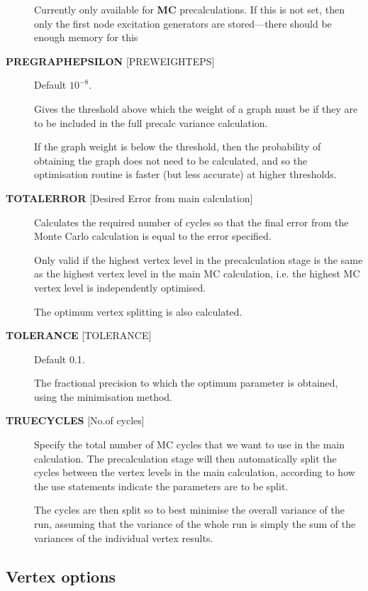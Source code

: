\documentclass[openany,a4paper,10pt]{manual}
\begin{document}
\begin{description}
Currently only available for \textbf{MC} precalculations. If this is not
set, then only the first node excitation generators are stored---there
should be enough memory for this

\item[\textbf{PREGRAPHEPSILON} {[}PREWEIGHTEPS{]}]
Default $10^{-8}$.

Gives the threshold above which the weight of a graph must be if
they are to be included in the full precalc variance calculation.

If the graph weight is below the threshold, then the probability
of obtaining the graph does not need to be calculated, and so
the optimisation routine is faster (but less accurate) at higher
thresholds.

\item[\textbf{TOTALERROR} {[}Desired Error from main calculation{]}]
Calculates the required number of cycles so that the final
error from the Monte Carlo calculation is equal to the error specified.

Only valid if the highest vertex level in the precalculation stage is the
same as the highest vertex level in the main MC calculation, i.e. the
highest MC vertex level is independently optimised.

The optimum vertex splitting is also calculated.

\item[\textbf{TOLERANCE} {[}TOLERANCE{]}]
Default 0.1.

The fractional precision to which the optimum parameter is obtained,
using the minimisation method.

\item[\textbf{TRUECYCLES} {[}No.of cycles{]}]
Specify the total number of MC cycles that we want to use in the
main calculation.  The precalculation stage will then automatically
split the cycles between the vertex levels in the main calculation,
according to how the use statements indicate the parameters are to
be split.

The cycles are then split so to best minimise the overall variance
of the run, assuming that the variance of the whole run is simply
the sum of the variances of the individual vertex results.

\end{description}


\subsection{Vertex options}
\end{document}
